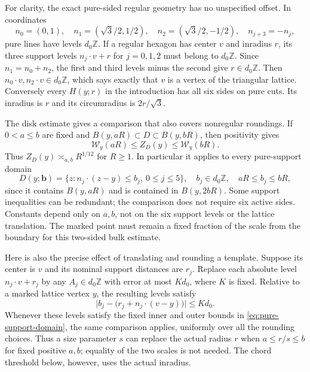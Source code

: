 For clarity, the exact pure-sided regular geometry has no unspecified offset. In coordinates
\[
 n_0=(0,1),\quad n_1=(\sqrt3/2,1/2),\quad
 n_2=(\sqrt3/2,-1/2),\quad n_{j+3}=-n_j,
\]
pure lines have levels $d_0\mathbb Z$. If a regular hexagon has center $v$ and inradius $r$, its three support levels $n_j\cdot v+r$ for $j=0,1,2$ must belong to $d_0\mathbb Z$. Since $n_1=n_0+n_2$, the first and third levels minus the second give $r\in d_0\mathbb Z$. Then $n_0\cdot v,n_2\cdot v\in d_0\mathbb Z$, which says exactly that $v$ is a vertex of the triangular lattice. Conversely every $H(y;r)$ in the introduction has all six sides on pure cuts. Its inradius is $r$ and its circumradius is $2r/\sqrt3$.

The disk estimate gives a comparison that also covers nonregular roundings. If $0<a\le b$ are fixed and $B(y,aR)\subset D\subset B(y,bR)$, then positivity gives
\[
 \mathcal W_y(aR)\le Z_D(y)\le\mathcal W_y(bR).
\]
Thus $Z_D(y)\asymp_{a,b}R^{1/12}$ for $R\ge1$. In particular it applies to every pure-support domain
\begin{equation}\label{eq:pure-support-domain}
 D(y;\mathbf b)=\{z:n_j\cdot(z-y)\le b_j,\ 0\le j\le5\},
 \quad b_j\in d_0\mathbb Z,
 \quad aR\le b_j\le bR,
\end{equation}
since it contains $B(y,aR)$ and is contained in $B(y,2bR)$. Some support inequalities can be redundant; the comparison does not require six active sides. Constants depend only on $a,b$, not on the six support levels or the lattice translation. The marked point must remain a fixed fraction of the scale from the boundary for this two-sided bulk estimate.

Here is also the precise effect of translating and rounding a template. Suppose its center is $v$ and its nominal support distances are $r_j$. Replace each absolute level $n_j\cdot v+r_j$ by any $A_j\in d_0\mathbb Z$ with error at most $K d_0$, where $K$ is fixed. Relative to a marked lattice vertex $y$, the resulting levels satisfy
\[
 \bigl|b_j-\bigl(r_j+n_j\cdot(v-y)\bigr)\bigr|\le Kd_0.
\]
Whenever these levels satisfy the fixed inner and outer bounds in \eqref{eq:pure-support-domain}, the same comparison applies, uniformly over all the rounding choices. Thus a size parameter $s$ can replace the actual radius $r$ when $a\le r/s\le b$ for fixed positive $a,b$; equality of the two scales is not needed. The chord threshold below, however, uses the actual inradius.


